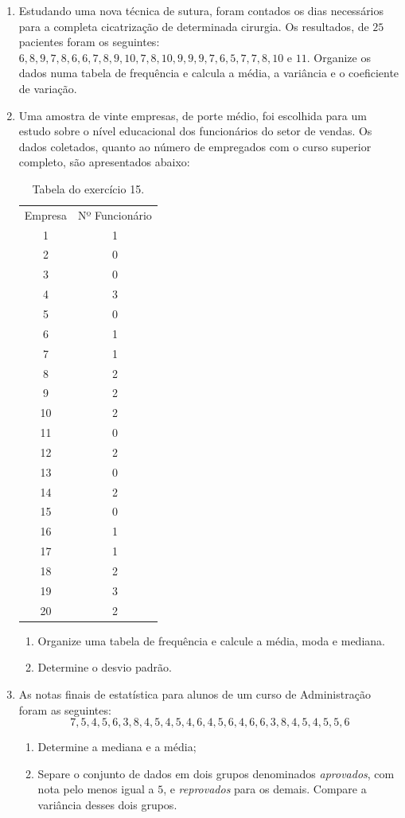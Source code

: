 \documentclass[oneside,a4paper,12pt]{article}
\begin{document}
\begin{enumerate}
	\item Estudando uma nova técnica de sutura, foram contados os dias necessários para a completa cicatrização de determinada cirurgia. Os resultados, de $25$ pacientes foram os seguintes: $6,8,9,7,8,6,6,7,8,9,10,7,8,10,9,9,9,7,6,5,7,7,8,10$ e $11$. Organize os dados numa tabela de frequência e calcula a média, a variância e o coeficiente de variação.
	
	\item Uma amostra de vinte empresas, de porte médio, foi escolhida para um estudo sobre o nível educacional dos funcionários do setor de vendas. Os dados coletados, quanto ao número de empregados com o curso superior completo, são apresentados abaixo:
	
	\begin{table}[h!]
		\centering
		\begin{tabular}{|c|c|}
			\hline
			Empresa	&	Nº Funcionário	\\
			1	&	1	\\
			2	&	0	\\
			3	&	0	\\
			4	&	3	\\
			5	&	0	\\
			6	&	1	\\
			7	&	1	\\
			8	&	2	\\
			9	&	2	\\
			10	&	2	\\
			11	&	0	\\
			12	&	2	\\
			13	&	0	\\
			14	&	2	\\
			15	&	0	\\
			16	&	1	\\
			17	&	1	\\
			18	&	2	\\
			19	&	3	\\
			20	&	2	\\\hline
		\end{tabular}
	\caption{Tabela do exercício 15.}
	\end{table}

	\begin{enumerate}
		\item Organize uma tabela de frequência e calcule a média, moda e mediana.
		\item Determine o desvio padrão.
	\end{enumerate}

	\item As notas finais de estatística para alunos de um curso de Administração foram as seguintes: $$7,5,4,5,6,3,8,4,5,4,5,4,6,4,5,6,4,6,6,3,8,4,5,4,5,5,6$$
	\begin{enumerate}
		\item Determine a mediana e a média;
		\item Separe o conjunto de dados em dois grupos denominados \emph{aprovados}, com nota pelo menos igual a $5$, e \emph{reprovados} para os demais. Compare a variância desses dois grupos.
	\end{enumerate}


\end{enumerate}
\end{document}
